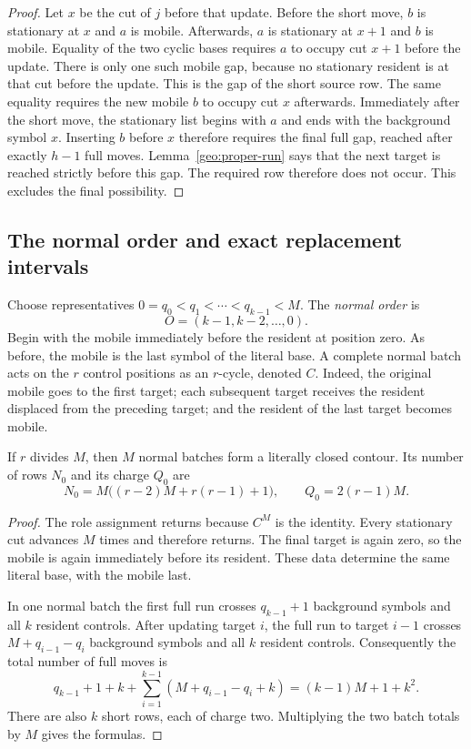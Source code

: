 \begin{proof}
Let $x$ be the cut of $j$ before that update. Before the short move, $b$
is stationary at $x$ and $a$ is mobile. Afterwards, $a$ is stationary at
$x+1$ and $b$ is mobile. Equality of the two cyclic bases requires $a$
to occupy cut $x+1$ before the update. There is only one such mobile gap,
because no stationary resident is at that cut before the update. This is
the gap of the short source row. The same equality requires the new
mobile $b$ to occupy cut $x$ afterwards. Immediately after the short move,
the stationary list begins with $a$ and ends with the background symbol
$x$. Inserting $b$ before $x$ therefore requires the final full gap,
reached after exactly $h-1$ full moves. Lemma~\ref{geo:proper-run} says
that the next target is reached strictly before this gap. The required
row therefore does not occur. This excludes the final possibility.
\end{proof}

\subsection{The normal order and exact replacement intervals}

Choose representatives $0=q_0<q_1<\cdots<q_{k-1}<M$. The \emph{normal
order} is
\[
 O=(k-1,k-2,\ldots,0).
\]
Begin with the mobile immediately before the resident at position zero.
As before, the mobile is the last symbol of the literal base. A complete
normal batch acts on the $r$ control positions as an $r$-cycle, denoted
$C$. Indeed, the original mobile goes to the first target; each subsequent
target receives the resident displaced from the preceding target; and the
resident of the last target becomes mobile.

\begin{lemma}
\label{geo:normal-counts}
If $r$ divides $M$, then $M$ normal batches form a literally closed
contour. Its number of rows $N_0$ and its charge $Q_0$ are
\[
 N_0=M\bigl((r-2)M+r(r-1)+1\bigr),
 \qquad Q_0=2(r-1)M.
\]
\end{lemma}
\begin{proof}
The role assignment returns because $C^M$ is the identity. Every
stationary cut advances $M$ times and therefore returns. The final target
is again zero, so the mobile is again immediately before its resident.
These data determine the same literal base, with the mobile last.

In one normal batch the first full run crosses $q_{k-1}+1$ background
symbols and all $k$ resident controls. After updating target $i$, the
full run to target $i-1$ crosses $M+q_{i-1}-q_i$ background symbols and
all $k$ resident controls. Consequently the total number of full moves is
\[
 q_{k-1}+1+k+
 \sum_{i=1}^{k-1}(M+q_{i-1}-q_i+k)
 =(k-1)M+1+k^2.
\]
There are also $k$ short rows, each of charge two. Multiplying the two
batch totals by $M$ gives the formulas.
\end{proof}

